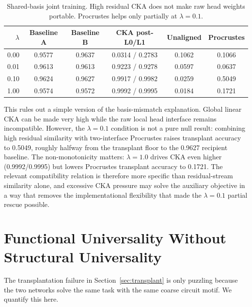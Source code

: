 \documentclass[final]{article}
\begin{document}
\begin{table}[h]
\centering
\caption{Shared-basis joint training. High residual CKA does not make raw head
weights portable. Procrustes helps only partially at $\lambda=0.1$.}
\label{tab:shared_basis}
\begin{tabular}{rccccc}
\toprule
$\lambda$ & Baseline A & Baseline B & CKA post-L0/L1 & Unaligned & Procrustes \\
\midrule
0.00 & 0.9577 & 0.9637 & 0.0314 / 0.2783 & 0.1062 & 0.1066 \\
0.01 & 0.9613 & 0.9613 & 0.9223 / 0.9278 & 0.0597 & 0.0637 \\
0.10 & 0.9624 & 0.9627 & 0.9917 / 0.9982 & 0.0259 & 0.5049 \\
1.00 & 0.9574 & 0.9572 & 0.9992 / 0.9995 & 0.0184 & 0.1721 \\
\bottomrule
\end{tabular}
\end{table}

This rules out a simple version of the basis-mismatch explanation. Global
linear CKA can be made very high while the raw local head interface remains
incompatible. However, the $\lambda=0.1$ condition is not a pure null result:
combining high residual similarity with two-interface Procrustes raises
transplant accuracy to 0.5049, roughly halfway from the transplant floor to the
0.9627 recipient baseline. The non-monotonicity matters: $\lambda=1.0$ drives
CKA even higher (0.9992/0.9995) but lowers Procrustes transplant accuracy to
0.1721. The relevant compatibility relation is therefore more specific than
residual-stream similarity alone, and excessive CKA pressure may solve the
auxiliary objective in a way that removes the implementational flexibility that
made the $\lambda=0.1$ partial rescue possible.

\section{Functional Universality Without Structural Universality}
\label{sec:universality}

The transplantation failure in Section~\ref{sec:transplant} is only puzzling
because the two networks solve the same task with the same coarse circuit motif.
We quantify this here.
\end{document}
